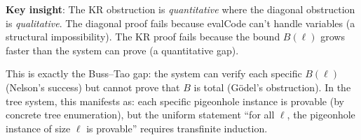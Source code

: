 \documentclass[11pt]{article}
\begin{document}
\textbf{Key insight}: The KR obstruction is \emph{quantitative} where the diagonal obstruction is \emph{qualitative}. The diagonal proof fails because evalCode can't handle variables (a structural impossibility). The KR proof fails because the bound $B(\ell)$ grows faster than the system can prove (a quantitative gap).

This is exactly the Buss--Tao gap: the system can verify each specific $B(\ell)$ (Nelson's success) but cannot prove that $B$ is total (G\"odel's obstruction). In the tree system, this manifests as: each specific pigeonhole instance is provable (by concrete tree enumeration), but the uniform statement ``for all $\ell$, the pigeonhole instance of size $\ell$ is provable'' requires transfinite induction.
\end{document}
